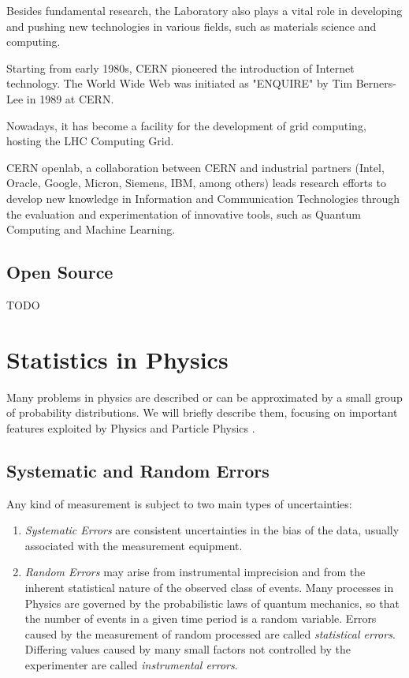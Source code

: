Besides fundamental research, the Laboratory also plays a vital role in developing and pushing new technologies in various fields, such as materials science and computing.

Starting from early 1980s, CERN pioneered the introduction of Internet technology. The World Wide Web was initiated as "ENQUIRE" by Tim Berners-Lee in 1989 at CERN.

Nowadays, it has become a facility for the development of grid computing, hosting the LHC Computing Grid.

CERN openlab, a collaboration between CERN and industrial partners (Intel, Oracle, Google, Micron, Siemens, IBM, among others) leads research efforts to develop new knowledge in Information and Communication Technologies through the evaluation and experimentation of innovative tools, such as Quantum Computing and Machine Learning.

\subsection{Open Source}

TODO

\section{Statistics in Physics}

Many problems in physics are described or can be approximated by a small group of probability distributions. We will briefly describe them, focusing on important features exploited by Physics and Particle Physics \cite{leo2012techniques}.

\subsection{Systematic and Random Errors}

Any kind of measurement is subject to two main types of uncertainties:

\begin{enumerate}
	\item \textit{Systematic Errors} are consistent uncertainties in the bias of the data, usually associated with the measurement equipment.
	\item \textit{Random Errors} may arise from instrumental imprecision and from the inherent statistical nature of the observed class of events. Many processes in Physics are governed by the probabilistic laws of quantum mechanics, so that the number of events in a given time period is a random variable. Errors caused by the measurement of random processed are called \textit{statistical errors}. Differing values caused by many small factors not controlled by the experimenter are called \textit{instrumental errors}.
\end{enumerate}

